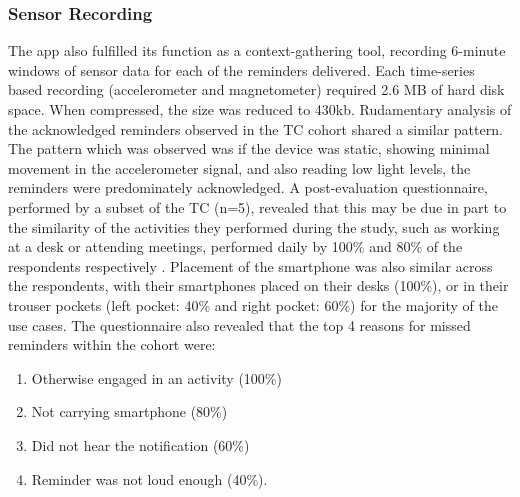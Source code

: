 \subsubsection{Sensor Recording}
The app also fulfilled its function as a context-gathering tool, recording 6-minute windows of sensor data for each of the reminders delivered. Each time-series based recording (accelerometer and magnetometer) required 2.6 MB of hard disk space. When compressed, the size was reduced to 430kb.
Rudamentary analysis of the acknowledged reminders observed in the TC cohort shared a similar pattern. The pattern which was observed was if the device was static, showing minimal movement in the accelerometer signal, and also reading low light levels, the reminders were predominately acknowledged.
 A post-evaluation questionnaire, performed by a subset of the TC (n=5), revealed that this may be due in part to the similarity of the activities they performed during the study, such as working at a desk or attending meetings, performed daily by 100\% and 80\% of the respondents respectively \cite{Hartin2014-EMBC}.
Placement of the smartphone was also similar across the respondents, with their smartphones placed on their desks (100\%), or in their trouser pockets (left pocket: 40\% and right pocket: 60\%) for the majority of the use cases. The questionnaire also revealed that the top 4 reasons for missed reminders within the cohort were:

\begin{enumerate}[noitemsep,topsep=0pt]
	\item Otherwise engaged in an activity (100\%)
	\item Not carrying smartphone (80\%)
	\item Did not hear the notification (60\%)
	\item Reminder was not loud enough (40\%).
\end{enumerate}

